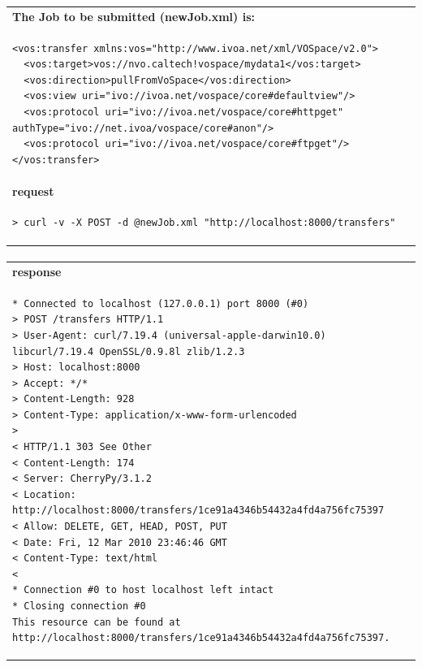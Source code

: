 \documentclass[11pt,a4paper]{ivoa}
\begin{document}
\begin{tabular}{ p{10cm} }
\\
\textbf{The Job to be submitted (newJob.xml) is:} \\
\begin{lstlisting}
<vos:transfer xmlns:vos="http://www.ivoa.net/xml/VOSpace/v2.0">
  <vos:target>vos://nvo.caltech!vospace/mydata1</vos:target>
  <vos:direction>pullFromVoSpace</vos:direction>
  <vos:view uri="ivo://ivoa.net/vospace/core#defaultview"/>
  <vos:protocol uri="ivo://ivoa.net/vospace/core#httpget" authType="ivo://net.ivoa/vospace/core#anon"/>
  <vos:protocol uri="ivo://ivoa.net/vospace/core#ftpget"/>
</vos:transfer>
\end{lstlisting} \\
\textbf{request} \\
\begin{lstlisting}
> curl -v -X POST -d @newJob.xml "http://localhost:8000/transfers"
\end{lstlisting} \\
\end{tabular}
\paragraph{}
\begin{tabular}{ p{10cm} }
\textbf{response} \\
\begin{lstlisting}
* Connected to localhost (127.0.0.1) port 8000 (#0)
> POST /transfers HTTP/1.1
> User-Agent: curl/7.19.4 (universal-apple-darwin10.0) libcurl/7.19.4 OpenSSL/0.9.8l zlib/1.2.3
> Host: localhost:8000
> Accept: */*
> Content-Length: 928
> Content-Type: application/x-www-form-urlencoded
> 
< HTTP/1.1 303 See Other
< Content-Length: 174
< Server: CherryPy/3.1.2
< Location: http://localhost:8000/transfers/1ce91a4346b54432a4fd4a756fc75397
< Allow: DELETE, GET, HEAD, POST, PUT
< Date: Fri, 12 Mar 2010 23:46:46 GMT
< Content-Type: text/html
< 
* Connection #0 to host localhost left intact
* Closing connection #0
This resource can be found at http://localhost:8000/transfers/1ce91a4346b54432a4fd4a756fc75397.
\end{lstlisting} \\
\end{tabular}
\end{document}

